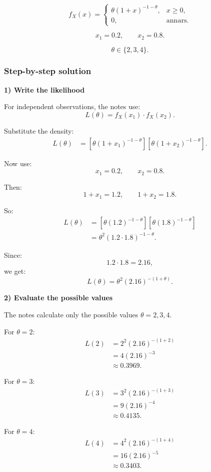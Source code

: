 \documentclass[10pt]{article}
\begin{document}
\[
f_X(x)=
\begin{cases}
\theta(1+x)^{-1-\theta},
& x\ge 0,\\
0,
& \text{annars}.
\end{cases}
\]

\[
x_1=0.2,
\qquad
x_2=0.8.
\]

\[
\theta\in\{2,3,4\}.
\]

\subsubsection*{Step-by-step solution}

\textbf{1) Write the likelihood}

For independent observations, the notes use:
\[
L(\theta)
=
f_X(x_1)\cdot f_X(x_2).
\]

Substitute the density:
\begin{align*}
L(\theta)
&=
\left[
\theta(1+x_1)^{-1-\theta}
\right]
\left[
\theta(1+x_2)^{-1-\theta}
\right].
\end{align*}

Now use:
\[
x_1=0.2,
\qquad
x_2=0.8.
\]

Then:
\[
1+x_1=1.2,
\qquad
1+x_2=1.8.
\]

So:
\begin{align*}
L(\theta)
&=
\left[
\theta(1.2)^{-1-\theta}
\right]
\left[
\theta(1.8)^{-1-\theta}
\right]
\\[2mm]
&=
\theta^2
\left(1.2\cdot 1.8\right)^{-1-\theta}.
\end{align*}

Since:
\[
1.2\cdot 1.8=2.16,
\]
we get:
\[
L(\theta)
=
\theta^2(2.16)^{-(1+\theta)}.
\]

\textbf{2) Evaluate the possible values}

The notes calculate only the possible values
\(\theta=2,3,4\).

For \(\theta=2\):
\begin{align*}
L(2)
&=
2^2(2.16)^{-(1+2)}
\\[2mm]
&=
4(2.16)^{-3}
\\[2mm]
&\approx 0.3969.
\end{align*}

For \(\theta=3\):
\begin{align*}
L(3)
&=
3^2(2.16)^{-(1+3)}
\\[2mm]
&=
9(2.16)^{-4}
\\[2mm]
&\approx 0.4135.
\end{align*}

For \(\theta=4\):
\begin{align*}
L(4)
&=
4^2(2.16)^{-(1+4)}
\\[2mm]
&=
16(2.16)^{-5}
\\[2mm]
&\approx 0.3403.
\end{align*}
\end{document}
